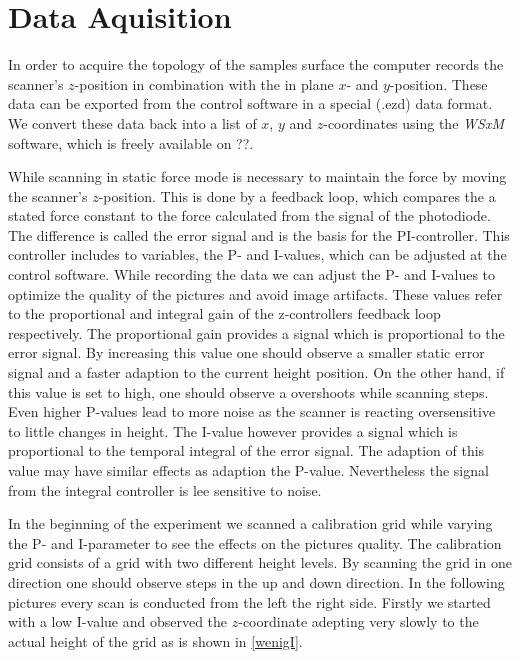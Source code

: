 \documentclass[paper=a4,fontsize=10pt,DIV=18,twocolumn,parskip=half]{scrartcl}
\numberwithin{equation}{section}    %
\begin{document}
\section{Data Aquisition}
\label{dataaquisition}
In order to acquire the topology of the samples surface the computer records the scanner's $z$-position in combination with the in plane $x$- and $y$-position. These data can be exported from the control software in a special (.ezd) data format. We convert these data back into a list of $x$, $y$ and $z$-coordinates using the \textit{WSxM} software, which is freely available on ??. 

While scanning in static force mode is necessary to maintain the force by moving the scanner's $z$-position. This is done by a feedback loop, which compares the a stated force constant to the force calculated from the signal of the photodiode. The difference is called the error signal and is the basis for the PI-controller. This controller includes to variables, the P- and I-values, which can be adjusted at the control software.
While recording the data we can adjust the P- and I-values to optimize the quality of the pictures and avoid image artifacts. These values refer to the proportional and integral gain of the z-controllers feedback loop respectively. The proportional gain provides a signal which is proportional to the error signal. By increasing this value one should observe a smaller static error signal and a faster adaption to the current height position.
On the other hand, if this value is set to high, one should observe a overshoots while scanning steps. Even higher P-values lead to more noise as the scanner is reacting oversensitive to little changes in height. The I-value however provides a signal which is proportional to the temporal integral of the error signal. The adaption of this value may have similar effects as adaption the P-value. Nevertheless the signal from the integral controller is lee sensitive to noise.

In the beginning of the experiment we scanned a calibration grid while varying the P- and I-parameter to see the effects on the pictures quality. The calibration grid consists of a grid with two different height levels. By scanning the grid in one direction one should observe steps in the up and down direction. In the following pictures every scan is conducted from the left the right side. Firstly we started with a low I-value and observed the $z$-coordinate adepting very slowly to the actual height of the grid as is shown in \ref{wenigI}.
\end{document}
